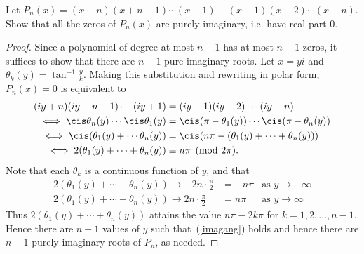 \begin{ex}
Let $P_n(x)=(x+n)(x+n-1)\cdots (x+1)-(x-1)(x-2)\cdots (x-n)$. Show that all the zeros of $P_n(x)$ are purely imaginary, i.e. have real part 0.
\end{ex}
\begin{proof}
Since a polynomial of degree at most $n-1$ has at most $n-1$ zeros, it suffices to show that there are $n-1$ pure imaginary roots. Let $x=yi$ and $\theta_k(y)=\tan^{-1}\frac{y}{k}$.
 Making this substitution and rewriting in polar form, $P_n(x)=0$ is equivalent to
\begin{align}
\nonumber(iy+n)(iy+n-1)\cdots (iy+1)&=(iy-1)(iy-2)\cdots (iy-n)\\
\nonumber\iff
\cis \theta_n(y)\cdots \cis\theta_1(y)&=\cis (\pi-\theta_1(y))\cdots \cis(\pi-\theta_n(y))\\
\nonumber\iff
\cis (\theta_1(y)+\cdots \theta_n(y))&=\cis (n\pi-(\theta_1(y)+\cdots +\theta_n(y)))\\
\label{imagang}\iff 2(\theta_1(y)+\cdots +\theta_n(y))&\equiv n\pi \pmod{2\pi}.
\end{align}
Note that each $\theta_k$ is a continuous function of $y$, and that 
\begin{align*}
2(\theta_1(y)+\cdots +\theta_n(y))\to -2n\cdot \frac{\pi}{2}&=-n\pi&\text{as }y\to -\infty\\
2(\theta_1(y)+\cdots +\theta_n(y))\to 2n\cdot \frac{\pi}{2}&=n\pi&\text{as }y\to \infty
\end{align*}
Thus $2(\theta_1(y)+\cdots +\theta_n(y))$ attains the value $n\pi-2k\pi$ for $k=1,2,\ldots, n-1$. Hence there are $n-1$ values of $y$ such that~(\ref{imagang}) holds and hence there are $n-1$ purely imaginary roots of $P_n$, as needed.
\end{proof}

